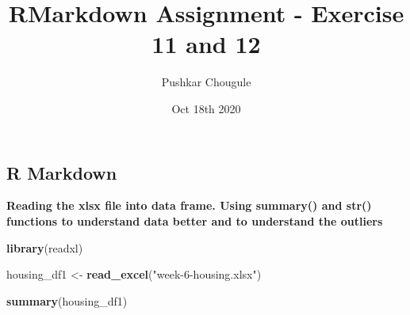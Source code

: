 \documentclass[
]{article}
\title{RMarkdown Assignment - Exercise 11 and 12}
\author{Pushkar Chougule}
\date{Oct 18th 2020}
\newenvironment{Shaded}{\begin{snugshade}}{\end{snugshade}}
\newcommand{\KeywordTok}[1]{\textcolor[rgb]{0.13,0.29,0.53}{\textbf{#1}}}
\newcommand{\NormalTok}[1]{#1}
\newcommand{\StringTok}[1]{\textcolor[rgb]{0.31,0.60,0.02}{#1}}
\begin{document}
\maketitle

\hypertarget{r-markdown}{%
\subsection{R Markdown}\label{r-markdown}}

\textbf{Reading the xlsx file into data frame. Using summary() and str()
functions to understand data better and to understand the outliers}

\begin{Shaded}
\begin{Highlighting}[]
\KeywordTok{library}\NormalTok{(readxl)}

\NormalTok{housing_df1 <-}\StringTok{ }\KeywordTok{read_excel}\NormalTok{(}\StringTok{"week-6-housing.xlsx"}\NormalTok{)}

\KeywordTok{summary}\NormalTok{(housing_df1)}
\end{Highlighting}
\end{Shaded}
\end{document}
